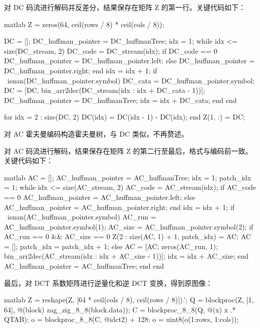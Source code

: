 \documentclass[a4paper]{article}  %
\begin{document}
对 DC 码流进行解码并反差分，结果保存在矩阵 Z 的第一行。关键代码如下：

\begin{codeblock}{matlab}
    Z = zeros(64, ceil(rows / 8) * ceil(cols / 8));

    DC = [];
    DC_huffman_pointer = DC_huffmanTree;
    idx = 1;
    while idx <= size(DC_stream, 2)
        DC_code = DC_stream(idx);
        if DC_code == 0
            DC_huffman_pointer = DC_huffman_pointer.left;
        else
            DC_huffman_pointer = DC_huffman_pointer.right;
        end
        idx = idx + 1;
        if ~isnan(DC_huffman_pointer.symbol)
            DC_cata = DC_huffman_pointer.symbol;
            DC = [DC, bin_arr2dec(DC_stream(idx : idx + DC_cata - 1))];
            DC_huffman_pointer = DC_huffmanTree;
            idx = idx + DC_cata;
        end
    end

    for idx = 2 : size(DC, 2)
        DC(idx) = DC(idx - 1) - DC(idx);
    end
    Z(1, :) = DC;
\end{codeblock}

对 AC 霍夫曼编码构造霍夫曼树，与 DC 类似，不再赘述。

对 AC 码流进行解码，结果保存在矩阵 Z 的第二行至最后，格式与编码前一致。关键代码如下：

\begin{codeblock}{matlab}
AC = [];
AC_huffman_pointer = AC_huffmanTree;
idx = 1;
patch_idx = 1;
while idx <= size(AC_stream, 2)
    AC_code = AC_stream(idx);
    if AC_code == 0
        AC_huffman_pointer = AC_huffman_pointer.left;
    else
        AC_huffman_pointer = AC_huffman_pointer.right;
    end
    idx = idx + 1;
    if ~isnan(AC_huffman_pointer.symbol)
        AC_run = AC_huffman_pointer.symbol(1);
        AC_size = AC_huffman_pointer.symbol(2);
        if AC_run == 0 && AC_size == 0
            Z(2 : size(AC, 1) + 1, patch_idx) = AC;
            AC = [];
            patch_idx = patch_idx + 1;
        else
            AC = [AC; zeros(AC_run, 1); bin_arr2dec(AC_stream(idx : idx + AC_size - 1))];
            idx = idx + AC_size;
        end
        AC_huffman_pointer = AC_huffmanTree;
    end
end
\end{codeblock}

最后，对 DCT 系数矩阵进行逆量化和逆 DCT 变换，得到原图像：

\begin{codeblock}{matlab}
Z = reshape(Z, [64 * ceil(cols / 8), ceil(rows / 8)]).';
Q = blockproc(Z, [1, 64], @(block) zag_zig_8_8(block.data));
C = blockproc_8_8(Q, @(x) x .* QTAB);
o = blockproc_8_8(C, @idct2) + 128;
o = uint8(o(1:rows, 1:cols));
\end{codeblock}
\end{document}
